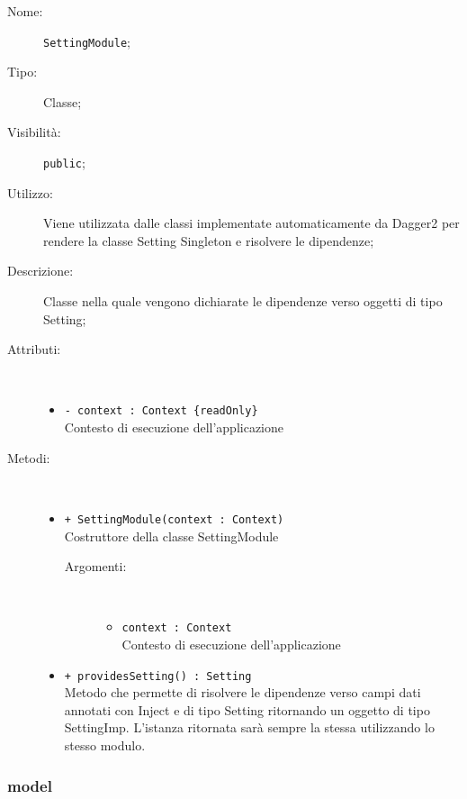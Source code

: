 \documentclass[../DefinizioneDiProdotto.tex]{subfiles}
\begin{document}
\begin{description}
	\item[Nome:] \texttt{SettingModule};
	\item[Tipo:] Classe;
	\item[Visibilità:] \texttt{public};
	\item[Utilizzo:] Viene utilizzata dalle classi implementate automaticamente da Dagger2 per rendere la classe Setting Singleton e risolvere le dipendenze;
	\item[Descrizione:] Classe nella quale vengono dichiarate le dipendenze verso oggetti di tipo Setting;
	\item[Attributi:] \
	\begin{itemize}
		\item \texttt{- context : Context \{readOnly\}}\\
		Contesto di esecuzione dell'applicazione
		
	\end{itemize}
	\item[Metodi:] \
	\begin{itemize}
		\item \texttt{+ SettingModule(context : Context)}\\
		Costruttore della classe SettingModule
		\begin{description}
			\item[Argomenti:] \
			\begin{itemize}
				\item \texttt{context : Context}\\
				Contesto di esecuzione dell'applicazione\end{itemize}
		\end{description}
		\item \texttt{+ providesSetting() : Setting}\\
		Metodo che permette di risolvere le dipendenze verso campi dati annotati con Inject e di tipo Setting ritornando un oggetto di tipo SettingImp. L'istanza ritornata sarà sempre la stessa utilizzando lo stesso modulo.
	\end{itemize}
\end{description}
\subsubsection{model}
\end{document}
